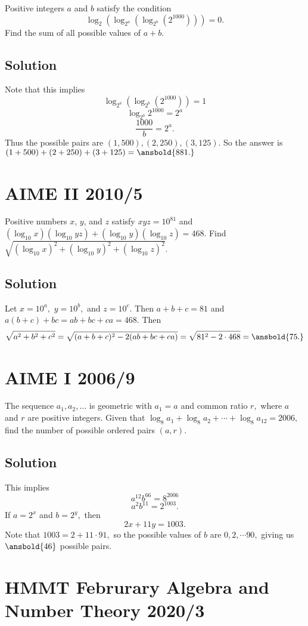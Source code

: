 \documentclass{article}
\begin{document}
Positive integers $a$ and $b$ satisfy the condition \[\log_2(\log_{2^a}(\log_{2^b}(2^{1000}))) = 0.\] Find the sum of all possible values of $a+b$.

\subsection{Solution}

Note that this implies
\[\log_{2^a}(\log_{2^b}(2^{1000}))=1\]
\[\log_{2^b}2^{1000}=2^a\]
\[\frac{1000}{b}=2^a.\]
Thus the possible pairs are $(1,500),(2,250),(3,125).$ So the answer is $(1+500)+(2+250)+(3+125)=\ansbold{881.}$

\pagebreak\section{AIME II 2010/5}

Positive numbers $x$, $y$, and $z$ satisfy $xyz = 10^{81}$ and $(\log_{10}x)(\log_{10} yz) + (\log_{10}y) (\log_{10}z) = 468$. Find $\sqrt {(\log_{10}x)^2 + (\log_{10}y)^2 + (\log_{10}z)^2}$.

\subsection{Solution}

Let $x=10^a,$ $y=10^b,$ and $z=10^c.$ Then $a+b+c=81$ and $a(b+c)+bc=ab+bc+ca=468.$ Then
\[\sqrt{a^2+b^2+c^2}=\sqrt{(a+b+c)^2-2(ab+bc+ca)}=\sqrt{81^2-2\cdot 468}=\ansbold{75.}\]

\pagebreak\section{AIME I 2006/9}

The sequence $a_1, a_2, \ldots$ is geometric with $a_1=a$ and common ratio $r,$ where $a$ and $r$ are positive integers. Given that $\log_8 a_1+\log_8 a_2+\cdots+\log_8 a_{12} = 2006,$ find the number of possible ordered pairs $(a,r).$

\subsection{Solution}

This implies
\[a^{12}b^{66}=8^{2006}\]
\[a^2b^{11}=2^{1003}.\]
If $a=2^x$ and $b=2^y,$ then
\[2x+11y=1003.\]
Note that $1003=2+11\cdot 91,$ so the possible values of $b$ are $0,2,\cdots 90,$ giving us $\ansbold{46}$ possible pairs.

\pagebreak\section{HMMT Februrary Algebra and Number Theory 2020/3}
\end{document}
